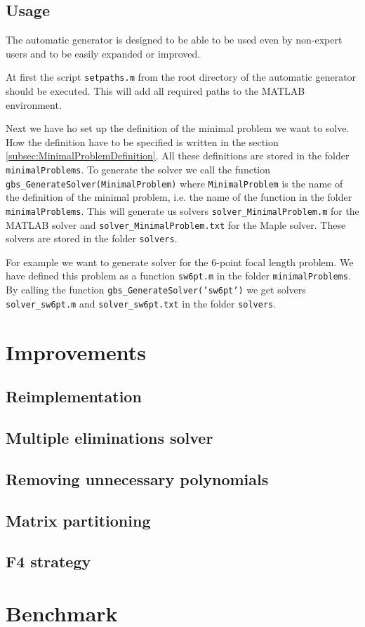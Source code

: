 \subsection{Usage}
The automatic generator is designed to be able to be used even by non-expert users and to be easily expanded or improved.

At first the script \texttt{setpaths.m} from the root directory of the automatic generator should be executed. This will add all required paths to the MATLAB environment.

Next we have ho set up the definition of the minimal problem we want to solve. How the definition have to be specified is written in the section \ref{subsec:MinimalProblemDefinition}. All these definitions are stored in the folder \texttt{minimalProblems}. To generate the solver we call the function \texttt{gbs\_GenerateSolver(MinimalProblem)} where \texttt{MinimalProblem} is the name of the definition of the minimal problem, i.e. the name of the function in the folder \texttt{minimalProblems}. This will generate us solvers \texttt{solver\_MinimalProblem.m} for the MATLAB solver and \texttt{solver\_MinimalProblem.txt} for the Maple solver. These solvers are stored in the folder \texttt{solvers}.

For example we want to generate solver for the 6-point focal length problem. We have defined this problem as a function \texttt{sw6pt.m} in the folder \texttt{minimalProblems}. By calling the function \texttt{gbs\_GenerateSolver('sw6pt')} we get solvers \texttt{solver\_sw6pt.m} and \texttt{solver\_sw6pt.txt} in the folder \texttt{solvers}.

\section{Improvements}

\subsection{Reimplementation}

\subsection{Multiple eliminations solver}

\subsection{Removing unnecessary polynomials}

\subsection{Matrix partitioning}

\subsection{F4 strategy}

\section{Benchmark}

